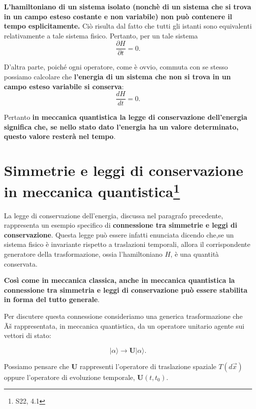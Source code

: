 \documentclass[a4paper,12pt,oneside]{book}
\begin{document}
\textbf{L'hamiltoniano di un sistema isolato (nonchè di un sistema che si trova in un campo esteso costante e non variabile) non può contenere il tempo esplicitamente.} Ciò risulta dal fatto che tutti gli istanti sono equivalenti relativamente a tale sistema fisico. Pertanto, per un tale sistema  
\begin{equation}
\frac{\partial H}{\partial{t}}=0.
\end{equation}

D'altra parte, poiché ogni operatore, come è ovvio, commuta con se stesso possiamo calcolare che \textbf{l'energia di un sistema che non si trova in un campo esteso variabile si conserva}:
\begin{equation}
\frac{dH}{dt}=0.
\end{equation}

Pertanto \textbf{in meccanica quantistica la legge di conservazione dell'energia significa che, se nello stato dato l'energia ha un valore determinato, questo valore resterà nel tempo}.

\section[Simmetrie e leggi di conservazione  in meccanica quantistica]{Simmetrie e leggi di conservazione  in meccanica quantistica\footnote{S22, 4.1 }} 

La legge di conservazione dell'energia, discussa nel paragrafo precedente, rappresenta un esempio specifico di \textbf{connessione tra simmetrie e leggi di conservazione}. Questa legge può essere infatti enunciata dicendo che,se un sistema fisico è invariante rispetto a traslazioni temporali, allora il corrispondente generatore della trasformazione, ossia l'hamiltoniano $H$, è una quantità conservata.

\textbf{Così come in meccanica classica, anche in meccanica quantistica la connessione tra simmetria e leggi di conservazione può essere stabilita in forma del tutto generale}.

Per discutere questa connessione consideriamo una generica trasformazione che Ãš rappresentata, in meccanica quantistica, da un operatore unitario agente sui vettori di stato:

\begin{equation}\label{eq:cap12_3}
|\alpha \rangle \rightarrow\textbf{U}|\alpha \rangle.
\end{equation}

Possiamo pensare che $\textbf{U}$ rappresenti l'operatore di traslazione spaziale $T(d\vec{x})$ oppure l'operatore di evoluzione temporale, $\textbf{U}(t,t_0)$.
\end{document}
